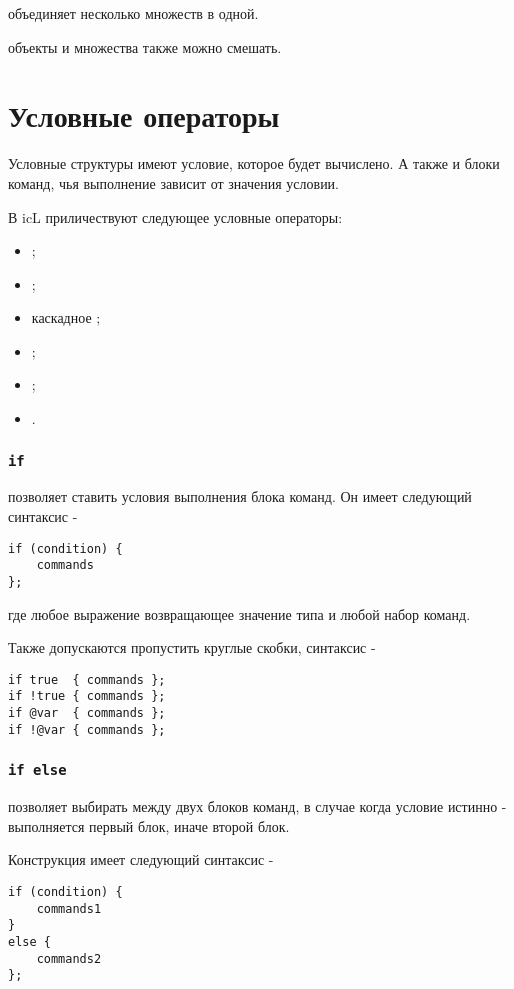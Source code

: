 \documentclass[a4paper, 14pt]{extarticle}
\newenvironment{icItems}
	{ \begin{itemize} [noitemsep,nolistsep] }
	{ \end{itemize} }
\begin{document}
 объединяет несколько множеств в одной.

 объекты и множества также можно смешать.

\newpage
\section{Условные операторы}

Условные структуры имеют условие, которое будет вычислено. А также и блоки команд, чья выполнение зависит от значения условии.

В icL приличествуют следующее условные операторы:
\begin{icItems}
	\item {};
	\item {};
	\item каскадное ;
	\item {};
	\item {};
	\item {}.
\end{icItems}

\subsubsection{\lstinline`if`}

 позволяет ставить условия выполнения блока команд. Он имеет следующий синтаксис -
\begin{lstlisting}[numbers=none]
if (condition) {
	commands
};
\end{lstlisting}
где  любое выражение возвращающее значение типа \bool{} и  любой набор команд.

Также допускаются пропустить круглые скобки, синтаксис -
\begin{lstlisting}[numbers=none]
if true  { commands };
if !true { commands };
if @var  { commands };
if !@var { commands };
\end{lstlisting}

\subsubsection{\lstinline`if else`}

 позволяет выбирать между двух блоков команд, в случае когда условие истинно - выполняется первый блок, иначе второй блок.

Конструкция  имеет следующий синтаксис -
\begin{lstlisting}[numbers=none]
if (condition) {
	commands1
}
else {
	commands2
};
\end{lstlisting}
\end{document}

